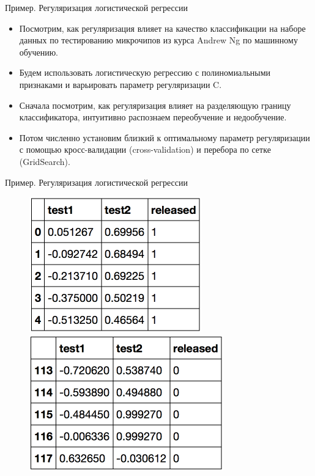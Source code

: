 \documentclass{beamer}
\begin{document}
\begin{frame}[fragile]{Пример. Регуляризация логистической регрессии}
\begin{itemize}
\item Посмотрим, как регуляризация влияет на качество классификации на наборе данных по тестированию микрочипов из курса Andrew Ng по машинному обучению.
\item Будем использовать логистическую регрессию с полиномиальными признаками и варьировать параметр регуляризации C.
\item Сначала посмотрим, как регуляризация влияет на разделяющую границу классификатора, интуитивно распознаем переобучение и недообучение.
\item Потом численно установим близкий к оптимальному параметр регуляризации с помощью кросс-валидации (cross-validation) и перебора по сетке (GridSearch).
\end{itemize}
\end{frame}

\begin{frame}[fragile]{Пример. Регуляризация логистической регрессии}
\begin{figure}[h]
\centering
\includegraphics[scale=0.5]{images/test-01.png}
\includegraphics[scale=0.5]{images/test-02.png}
\end{figure}
\end{frame}
\end{document}
